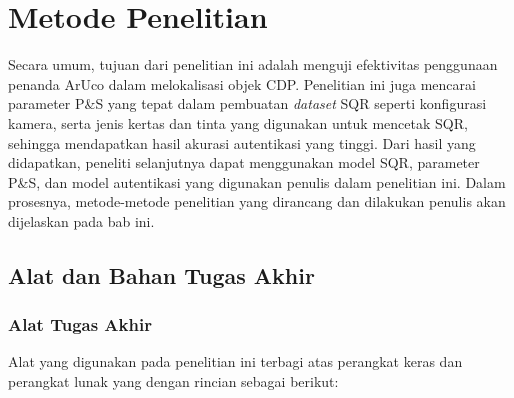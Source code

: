 \chapter{Metode Penelitian}
Secara umum, tujuan dari penelitian ini adalah menguji efektivitas penggunaan penanda ArUco dalam melokalisasi objek CDP. Penelitian ini juga mencarai
parameter P\&S yang tepat dalam pembuatan \emph{dataset} SQR seperti konfigurasi kamera, serta jenis kertas dan tinta yang digunakan untuk mencetak SQR,
sehingga mendapatkan hasil akurasi autentikasi yang tinggi. Dari hasil yang didapatkan, peneliti selanjutnya dapat menggunakan model SQR, parameter P\&S, dan
model autentikasi yang digunakan penulis dalam penelitian ini. Dalam prosesnya, metode-metode penelitian yang dirancang dan dilakukan penulis akan dijelaskan
pada bab ini.

\section{Alat dan Bahan Tugas Akhir}

\subsection{Alat Tugas Akhir}

Alat yang digunakan pada penelitian ini terbagi atas perangkat keras dan perangkat lunak yang dengan rincian sebagai berikut:

